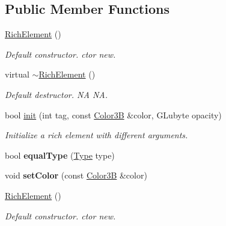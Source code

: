 \subsection*{Public Member Functions}
\begin{DoxyCompactItemize}
\item 
\mbox{\label{classui_1_1RichElement_ae53b3f32befe8ba3816f8b8f31c3dfe8}} 
\hyperlink{classui_1_1RichElement_ae53b3f32befe8ba3816f8b8f31c3dfe8}{Rich\+Element} ()
\begin{DoxyCompactList}\small\item\em Default constructor.  ctor  new. \end{DoxyCompactList}\item 
\mbox{\label{classui_1_1RichElement_a214de95b7f746adf5f27ac977a3f7b7c}} 
virtual \hyperlink{classui_1_1RichElement_a214de95b7f746adf5f27ac977a3f7b7c}{$\sim$\+Rich\+Element} ()
\begin{DoxyCompactList}\small\item\em Default destructor.  NA  NA. \end{DoxyCompactList}\item 
bool \hyperlink{classui_1_1RichElement_a8d276a4dfd99f9b666e3a9d304b8cdd8}{init} (int tag, const \hyperlink{structColor3B}{Color3B} \&color, G\+Lubyte opacity)
\begin{DoxyCompactList}\small\item\em Initialize a rich element with different arguments. \end{DoxyCompactList}\item 
\mbox{\label{classui_1_1RichElement_a89e0ffb27270132c5a4020b88230ac0f}} 
bool {\bfseries equal\+Type} (\hyperlink{classui_1_1RichElement_a6840f6ae352b476f553659d9ecbf48c3}{Type} type)
\item 
\mbox{\label{classui_1_1RichElement_afe17a5b3e2840f451d81c49d98f23340}} 
void {\bfseries set\+Color} (const \hyperlink{structColor3B}{Color3B} \&color)
\item 
\mbox{\label{classui_1_1RichElement_ae53b3f32befe8ba3816f8b8f31c3dfe8}} 
\hyperlink{classui_1_1RichElement_ae53b3f32befe8ba3816f8b8f31c3dfe8}{Rich\+Element} ()
\begin{DoxyCompactList}\small\item\em Default constructor.  ctor  new. \end{DoxyCompactList}\item 

\end{DoxyCompactItemize}
